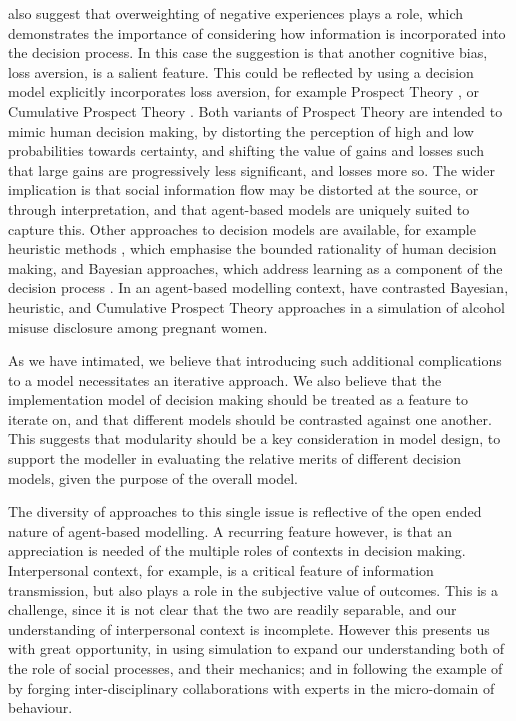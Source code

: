 \documentclass{article}
\begin{document}
\citeauthor{McKenzie2013} also suggest that overweighting of negative experiences plays a role, which demonstrates the importance of considering how information is incorporated into the decision process. In this case the suggestion is that another cognitive bias, loss aversion, is a salient feature. This could be reflected by using a decision model explicitly incorporates loss aversion, for example Prospect Theory \citep{Kahneman1979}, or Cumulative Prospect Theory \citep{Tversky1992}. Both variants of Prospect Theory are intended to mimic human decision making, by distorting the perception of high and low probabilities towards certainty, and shifting the value of gains and losses such that large gains are progressively less significant, and losses more so. 
The wider implication is that social information flow may be distorted at the source, or through interpretation, and that agent-based models are uniquely suited to capture this.  Other approaches to decision models are available, for example heuristic methods \citep{Gigerenzer1996}, which emphasise the bounded rationality of human decision making, and Bayesian approaches, which address learning as a component of the decision process \citep{Robbins1964}. In an agent-based modelling context, \citet{Gray2016} have contrasted Bayesian, heuristic, and Cumulative Prospect Theory approaches in a simulation of alcohol misuse disclosure among pregnant women.

As we have intimated, we believe that introducing such additional complications to a model necessitates an iterative approach. We also believe that the implementation model of decision making should be treated as a feature to iterate on, and that different models should be contrasted against one another. This suggests that modularity should be a key consideration in model design, to support the modeller in evaluating the relative merits of different decision models, given the purpose of the overall model.

The diversity of approaches to this single issue is reflective of the open ended nature of agent-based modelling. A recurring feature however, is that an appreciation is needed of the multiple roles of contexts in decision making. Interpersonal context, for example, is a critical feature of information transmission, but also plays a role in the subjective value of outcomes. This is a challenge, since it is not clear that the two are readily separable, and our understanding of interpersonal context is incomplete.
However this presents us with great opportunity, in using simulation to expand our understanding both of the role of social processes, and their mechanics; and in following the example of \citeauthor{Tversky1992} by forging inter-disciplinary collaborations with experts in the micro-domain of behaviour.
\end{document}
